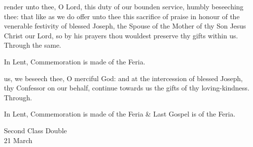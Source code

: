 \secret
{} render unto thee, O Lord, this duty of our bounden service, humbly beseeching thee: that like as we do offer unto thee this sacrifice of praise in honour of the venerable festivity of blessed Joseph, the Spouse of the Mother of thy Son Jesus Christ our Lord, so by his prayers thou wouldest preserve thy gifts within us. Through the same.
\begin{rubric}
    In Lent, Commemoration is made of the Feria.
\end{rubric}
\postcommunion
{} us, we beseech thee, O merciful God: and at the intercession of blessed Joseph, thy Confessor on our behalf, continue towards us the gifts of thy loving-kindness. Through.
\begin{rubric}
    In Lent, Commemoration is made of the Feria \& Last Gospel is of the Feria.
\end{rubric}


\clearpage
{}
\begin{inhead}
    {Second Class Double\\
21 March}
\end{inhead}

